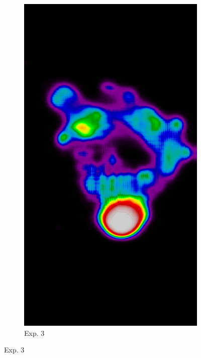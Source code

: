 \documentclass{beamer}
\begin{document}
\begin{frame}
\begin{figure}
\begin{subfigure}{0.134\textwidth}
		            \includegraphics[width=\textwidth]{plots/examples/example5_probs_3.png}
	            \caption*{\footnotesize Exp. 3}
            \end{subfigure}
        \end{figure}
    \end{frame}
    
\end{document}
